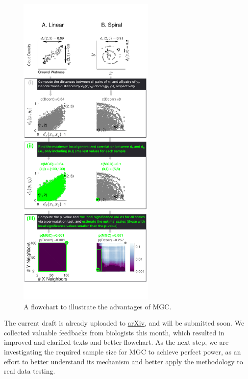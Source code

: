 \documentclass[simplex.tex]{subfiles}
\begin{document}
\begin{figure}[h!]
\begin{cframed}
		\centering
		\includegraphics[width=0.6\textwidth]{../../figs/Fig1Allb}
    \caption{A flowchart to illustrate the advantages of MGC.}
		\label{fig:all}
		\end{cframed}
\end{figure}

The current draft is already uploaded to \href{https://arxiv.org/pdf/1609.05148.pdf}{arXiv}, and will be submitted soon. We collected valuable feedbacks from biologists this month, which resulted in improved and clarified texts and better flowchart. As the next step, we are investigating the required sample size for MGC to achieve perfect power, as an effort to better understand its mechanism and better apply the methodology to real data testing. 
\end{document}
